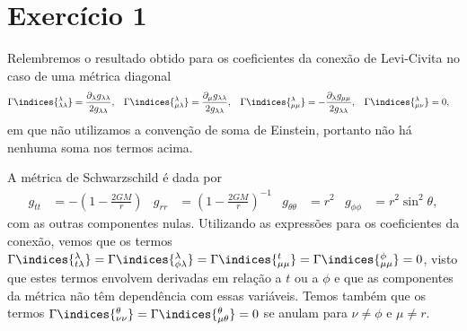 \section*{Exercício 1}
Relembremos o resultado obtido para os coeficientes da conexão de Levi-Civita no caso de uma métrica diagonal
\begin{align*}
    \Gamma\indices{^\lambda_{\lambda\lambda}} &=\frac{\partial_{\lambda}g_{\lambda \lambda}}{2g_{\lambda \lambda}},&
    \Gamma\indices{^\lambda_{\mu\lambda}} &= \frac{\partial_{\mu}g_{\lambda \lambda}}{2g_{\lambda \lambda}},&
    \Gamma\indices{^\lambda_{\mu\mu}} &= -\frac{\partial_{\lambda}g_{\mu\mu}}{2g_{\lambda \lambda}},&
    \Gamma\indices{^\lambda_{\mu\nu}} &= 0,
\end{align*}
em que não utilizamos a convenção de soma de Einstein, portanto não há nenhuma soma nos termos acima.

A métrica de Schwarzschild é dada por
\begin{align*}
    g_{tt} &= -\left(1 - \frac{2GM}{r}\right)&
    g_{rr} &= \left(1 - \frac{2GM}{r}\right)^{-1}&
    g_{\theta\theta} &= r^2&
    g_{\phi\phi} &= r^2\sin^2\theta,
\end{align*}
com as outras componentes nulas. Utilizando as expressões para os coeficientes da conexão, vemos que os termos \(\Gamma\indices{^\lambda_{t \lambda}} = \Gamma\indices{^\lambda_{\phi \lambda}} = \Gamma\indices{^t_{\mu\mu}} = \Gamma\indices{^\phi_{\mu\mu}} = 0\), visto que estes termos envolvem derivadas em relação a \(t\) ou a \(\phi\) e que as componentes da métrica não têm dependência com essas variáveis. Temos também que os termos \(\Gamma\indices{^\theta_{\nu\nu}} = \Gamma\indices{^\theta_{\mu\theta}} = 0\) se anulam para \(\nu \neq \phi\) e \(\mu \neq r\).


